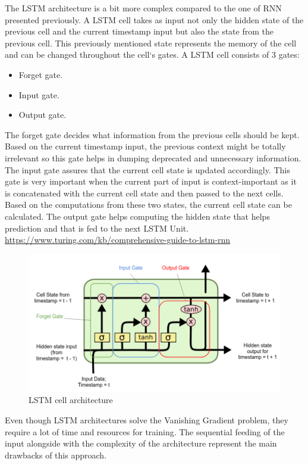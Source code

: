\documentclass[12pt,a4paper]{report}
\begin{document}
The LSTM architecture is a bit more complex compared to the one of RNN presented previously. A LSTM cell takes as input not only the hidden state of the previous cell and the current timestamp input but also the state from the previous cell. This previously mentioned state represents the memory of the cell and can be changed throughout the cell`s gates. A LSTM cell consists of 3 gates:
\begin{itemize}
    \item Forget gate.
    \item Input gate.
    \item Output gate.
\end{itemize}
The forget gate decides what information from the previous cells should be kept. Based on the current timestamp input, the previous context might be totally irrelevant so this gate helps in dumping deprecated and unnecessary information. The input gate assures that the current cell state is updated accordingly. This gate is very important when the current part of input is context-important as it is concatenated with the current cell state and then passed to the next cells. Based on the computations from these two states, the current cell state can be calculated. The output gate helps computing the hidden state that helps prediction and that is fed to the next LSTM Unit.
\urldef{\urlLSTM}\url{https://www.turing.com/kb/comprehensive-guide-to-lstm-rnn}
\begin{figure}[H]
\centering
\includegraphics[width=15cm]{pics/lstm.png}
  \caption[LSTM cell architecture]{LSTM cell architecture\footnotemark}
  \label{fig:LSTM}
\end{figure}
\footnotetext{\urlLSTM}

Even though LSTM architectures solve the Vanishing Gradient problem, they require a lot of time and resources for training. The sequential feeding of the input alongside with the complexity of the architecture represent the main drawbacks of this approach.
\end{document}
